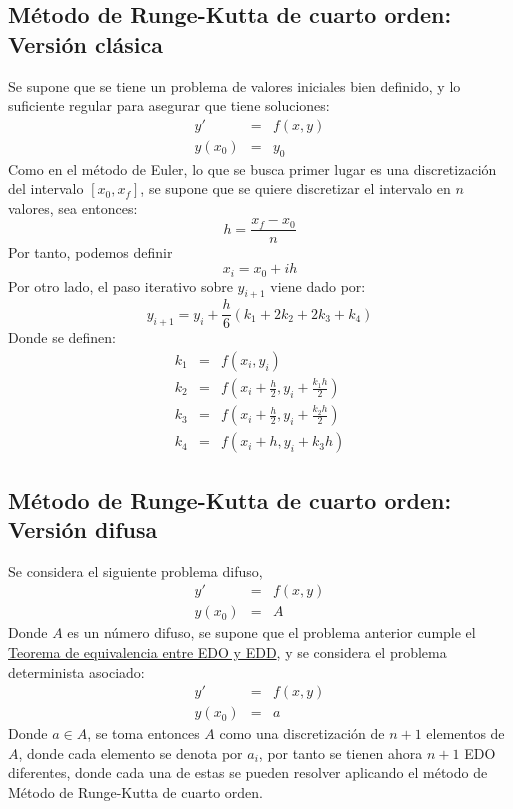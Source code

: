 \subsection{Método de Runge-Kutta de cuarto orden: Versión clásica}
Se supone que se tiene un problema de valores iniciales bien definido, y lo suficiente regular para asegurar que tiene soluciones:
\[
\begin{array}{ccc}
y' & = &f(x, y)  \\
y(x_0) & = & y_0
\end{array}
\]
Como en el método de Euler, lo que se busca primer lugar es una discretización del intervalo $[x_0, x_f]$, se supone que se quiere discretizar el intervalo en $n$ valores, sea entonces:
\[
	h = \frac{x_f - x_0}{n}
\]
Por tanto, podemos definir 
\[
	x_i = x_0 + i h
\]
Por otro lado, el paso iterativo sobre $y_{i+1}$ viene dado por:
\[
	y_{i+1} = y_i + \frac{h}{6} (k_1 + 2k_2 + 2k_3 + k_4)
\]
Donde se definen:
\[
\begin{array}{ccc}
	k_1 & = & f(x_i, y_i) \\
	k_2 & = & f\left(x_i + \frac{h}{2}, y_i + \frac{k_1 h}{2}\right) \\
	k_3 & = & f\left(x_i + \frac{h}{2}, y_i + \frac{k_2 h}{2}\right) \\
	k_4 & = & f(x_i + h, y_i + k_3 h)
\end{array}
\]

\subsection{Método de Runge-Kutta de cuarto orden: Versión difusa}
Se considera el siguiente problema difuso,
\[
\begin{array}{ccc}
y' & = &f(x, y)  \\
y(x_0) & = & A
\end{array}
\]
Donde $A$ es un número difuso, se supone que el problema anterior cumple el \hyperref[teorema:equivalencia]{Teorema de equivalencia entre EDO y EDD}, y se considera el problema determinista asociado:
\[
\begin{array}{ccc}
y' & = &f(x, y)  \\
y(x_0) & = & a
\end{array}
\]
Donde $a \in A$, se toma entonces $A$ como una discretización de $n+1$ elementos de $A$, donde cada elemento se denota por $a_i$, por tanto se tienen ahora $n+1$ EDO diferentes, donde cada una de estas se pueden resolver aplicando el método de Método de Runge-Kutta de cuarto orden.

